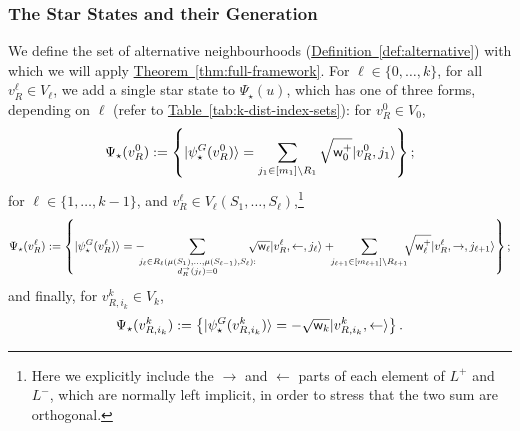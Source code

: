 \documentclass{article}
\newcommand{\thm}[1]{\hyperref[thm:#1]{Theorem~\ref*{thm:#1}}}
\newcommand{\tabl}[1]{\hyperref[tab:#1]{Table~\ref*{tab:#1}}}
\newcommand{\defin}[1]{\hyperref[def:#1]{Definition~\ref*{def:#1}}}
\def\ket#1{{\lvert}#1\rangle}
\renewcommand{\>}{\rangle}
\newcommand{\<}{\langle}
\renewcommand{\(}{\left(}
\renewcommand{\)}{\right)}
\def\w{{\sf w}}
\begin{document}
\subsubsection{The Star States and their Generation}\label{sec:k-dist-star-states}

We define the set of alternative neighbourhoods (\defin{alternative}) with which we will apply \thm{full-framework}. 
For $\ell\in\{0,\dots,k\}$, for all  $v^{\ell}_R \in V_\ell$, we add a single star state to $\Psi_\star(u)$, which has one of three forms, depending on $\ell$ (refer to \tabl{k-dist-index-sets}): for $v^0_R\in V_0$,
\begin{equation}
\Psi_\star(v^{0}_R):=\left\{\ket{\psi_\star^G(v^{0}_R)}=
\sum_{j_1\in [m_1]\setminus R_1}\sqrt{\w_{0}^+}\ket{v^0_R,j_1}
\right\};\label{eq:k-star-v0}
\end{equation} 
for $\ell\in\{1,\dots,k-1\}$, and 
$v^{\ell}_R\in V_{\ell}(S_1,\dots,S_{\ell})$,\footnote{Here we explicitly include the $\rightarrow$ and $\leftarrow$ parts of each element of $L^+$ and $L^-$, which are normally left implicit, in order to stress that the two sum are orthogonal.}
\begin{equation}
\Psi_\star(v^{\ell}_R):=\left\{\ket{\psi_\star^G(v^{\ell}_R)}=-\!\!\!\!
\sum_{\substack{ j_{\ell}\in R_{\ell}(\mu(S_1),\dots,\mu(S_{\ell-1}),S_{\ell}):\\ d_R^{\rightarrow}(j_{\ell})=0}}\!\!\!\!\!\sqrt{\w_{\ell}}\ket{v^{\ell}_R,\leftarrow,j_{\ell}} 
+\!\!\!\sum_{j_{\ell+1}\in [m_{\ell+1}]\setminus R_{\ell+1}}\!\!\!
\sqrt{\w_{\ell}^+}\ket{v^{\ell}_R,\rightarrow,j_{\ell+1}}
\right\};\label{eq:k-star-v-ell}
\end{equation} 
and finally, for $v^k_{R,i_k}\in V_k$,
\begin{equation}
\Psi_\star(v^{k}_{R,i_k}):=\left\{\ket{\psi_\star^G(v^{k}_{R,i_k})}=
-\sqrt{\w_k}\ket{v^k_{R,i_k},\leftarrow}
\right\}.\label{eq:k-star-vk}
\end{equation} 
\end{document}
